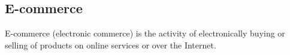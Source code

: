 \section{}
\subsection*{E-commerce}
E-commerce (electronic commerce) is the activity of electronically buying or selling of products on online services or over the Internet.